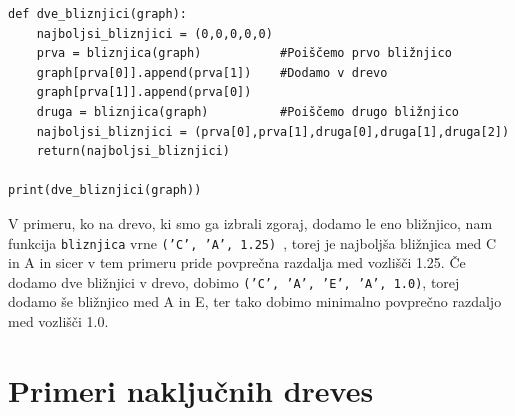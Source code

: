 \documentclass[a4paper,10pt]{article}
\begin{document}
\begin{verbatim}
def dve_bliznjici(graph):
    najboljsi_bliznjici = (0,0,0,0,0)
    prva = bliznjica(graph)           #Poiščemo prvo bližnjico
    graph[prva[0]].append(prva[1])    #Dodamo v drevo
    graph[prva[1]].append(prva[0])  
    druga = bliznjica(graph)          #Poiščemo drugo bližnjico
    najboljsi_bliznjici = (prva[0],prva[1],druga[0],druga[1],druga[2])
    return(najboljsi_bliznjici)

print(dve_bliznjici(graph))
\end{verbatim}

V primeru, ko na drevo, ki smo ga izbrali zgoraj, dodamo le eno bližnjico, nam funkcija \texttt{bliznjica} vrne \texttt{('C', 'A', 1.25) }, torej je najboljša bližnjica med C in A in sicer v tem primeru pride povprečna razdalja med vozlišči 1.25. Če dodamo dve bližnjici v drevo, dobimo \texttt{('C', 'A', 'E', 'A', 1.0)}, torej dodamo še bližnjico med A in E, ter tako dobimo minimalno povprečno razdaljo med vozlišči 1.0.

\section{Primeri naključnih dreves}
\end{document}
